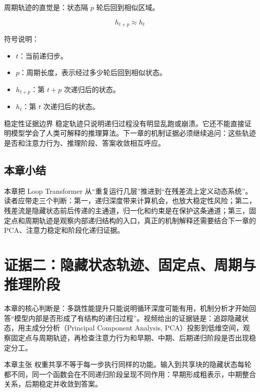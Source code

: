 ﻿\documentclass[a4paper]{article}
\begin{document}
周期轨迹的直觉是：状态隔 \(p\) 轮后回到相似区域。

\[
h_{t+p}\approx h_t
\]

符号说明：
\begin{itemize}
  \item \(t\)：当前递归步。
  \item \(p\)：周期长度，表示经过多少轮后回到相似状态。
  \item \(h_{t+p}\)：第 \(t+p\) 次递归后的状态。
  \item \(h_t\)：第 \(t\) 次递归后的状态。
\end{itemize}

\begin{warningbox}{稳定性证据边界}
稳定轨迹只说明递归过程没有明显乱跑或崩溃。它还不能直接证明模型学会了人类可解释的推理算法。下一章的机制证据必须继续追问：这些轨迹是否和注意力行为、推理阶段、答案收敛相互呼应。
\end{warningbox}

\subsection{本章小结}

本章把 Loop Transformer 从“重复运行几层”推进到“在残差流上定义动态系统”。读者应带走三个判断：第一，递归深度带来计算机会，也放大稳定性风险；第二，残差流是隐藏状态前后传递的主通道，归一化和约束是在保护这条通道；第三，固定点和周期轨迹是观察内部递归结构的入口，真正的机制解释还需要结合下一章的 PCA、注意力稳定和阶段化递归证据。


\section{证据二：隐藏状态轨迹、固定点、周期与推理阶段}
\label{sec:mechanistic-analysis}

本章的核心判断是：多跳性能提升只能说明循环深度可能有用，机制分析才开始回答“模型内部是否形成了有结构的递归过程”。视频给出的证据链是：追踪隐藏状态，用主成分分析（Principal Component Analysis, PCA）投影到低维空间，观察固定点与周期轨迹，再检查注意力行为和早期、中期、后期递归阶段是否出现稳定分工。

\begin{importantbox}{本章主张}
权重共享不等于每一步执行同样的功能。输入到共享块的隐藏状态每轮都不同，同一个函数会在不同递归阶段呈现不同作用：早期形成粗表示，中期整合关系，后期稳定并收敛到答案。
\end{importantbox}
\end{document}
